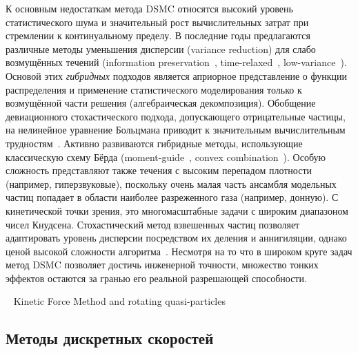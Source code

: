 К основным недостаткам метода DSMC относятся высокий уровень статистического шума
и значительный рост вычислительных затрат при стремлении к континуальному пределу.
В последние годы предлагаются различные методы уменьшения дисперсии (variance reduction) для слабо возмущённых течений
(information preservation~\cite{Fan2001, Sun2002}, time-relaxed~\cite{Pareschi2001, Pareschi2011},
low-variance~\cite{Hadji2005, Hadji2007, Hadji2011}).
Основой этих \emph{гибридных} подходов является априорное представление о функции распределения
и применение статистического моделирования только к возмущённой части решения (алгебраическая декомпозиция).
Обобщение девиационного стохастического подхода, допускающего отрицательные частицы,
на нелинейное уравнение Больцмана приводит к значительным вычислительным трудностям~\cite{Wagner2008}.
Активно развиваются гибридные методы, использующие классическую схему Бёрда
(moment-guide~\cite{Dimarco2011, Dimarco2013}, convex combination~\cite{Dimarco2008, Caflisch2016}).
Особую сложность представляют также течения с высоким перепадом плотности (например, гиперзвуковые),
поскольку очень малая часть ансамбля модельных частиц попадает в области наиболее разреженного газа (например, донную).
С кинетической точки зрения, это многомасштабные задачи с широким диапазоном чисел Кнудсена.
Стохастический метод взвешенных частиц позволяет адаптировать уровень дисперсии посредством
их деления и аннигиляции, однако ценой высокой сложности алгоритма~\cite{Rjasanow1996, Rjasanow2005}.
Несмотря на то что в широком круге задач метод DSMC позволяет достичь инженерной точности,
множество тонких эффектов остаются за гранью его реальной разрешающей способности.

~\cite{Villani1999divergent} Kinetic Force Method and rotating quasi-particles~\cite{Saveliev2002}

\subsection{Методы дискретных скоростей}

